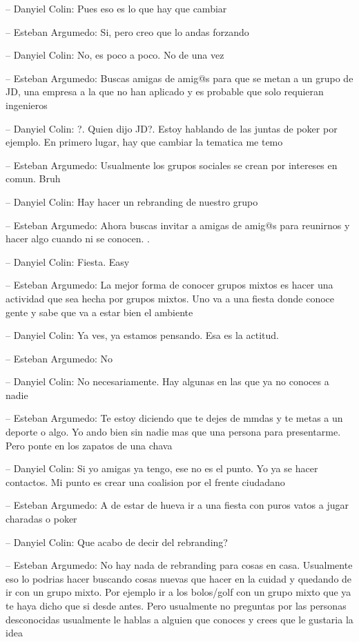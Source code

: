 -- Danyiel Colin: Pues eso es lo que hay que cambiar

-- Esteban Argumedo: Si, pero creo que lo andas forzando

-- Danyiel Colin: No, es poco a poco. No de una vez

-- Esteban Argumedo: Buscas amigas de amig@s para que se metan a un
grupo de JD, una empresa a la que no han aplicado y es probable que solo
requieran ingenieros

-- Danyiel Colin: ?. Quien dijo JD?. Estoy hablando de las juntas de
poker por ejemplo. En primero lugar, hay que cambiar la tematica me temo

-- Esteban Argumedo: Usualmente los grupos sociales se crean por
intereses en comun. Bruh

-- Danyiel Colin: Hay hacer un rebranding de nuestro grupo

-- Esteban Argumedo: Ahora buscas invitar a amigas de amig@s para
reunirnos y hacer algo cuando ni se conocen. .

-- Danyiel Colin: Fiesta. Easy

-- Esteban Argumedo: La mejor forma de conocer grupos mixtos es hacer
una actividad que sea hecha por grupos mixtos. Uno va a una fiesta donde
conoce gente y sabe que va a estar bien el ambiente

-- Danyiel Colin: Ya ves, ya estamos pensando. Esa es la actitud.

-- Esteban Argumedo: No

-- Danyiel Colin: No necesariamente. Hay algunas en las que ya no
conoces a nadie

-- Esteban Argumedo: Te estoy diciendo que te dejes de mmdas y te metas
a un deporte o algo. Yo ando bien sin nadie mas que una persona para
presentarme. Pero ponte en los zapatos de una chava

-- Danyiel Colin: Si yo amigas ya tengo, ese no es el punto. Yo ya se
hacer contactos. Mi punto es crear una coalision por el frente ciudadano

-- Esteban Argumedo: A de estar de hueva ir a una fiesta con puros vatos
a jugar charadas o poker

-- Danyiel Colin: Que acabo de decir del rebranding?

-- Esteban Argumedo: No hay nada de rebranding para cosas en casa.
Usualmente eso lo podrias hacer buscando cosas nuevas que hacer en la
cuidad y quedando de ir con un grupo mixto. Por ejemplo ir a los
bolos/golf con un grupo mixto que ya te haya dicho que si desde antes.
Pero usualmente no preguntas por las personas desconocidas usualmente le
hablas a alguien que conoces y crees que le gustaria la idea

